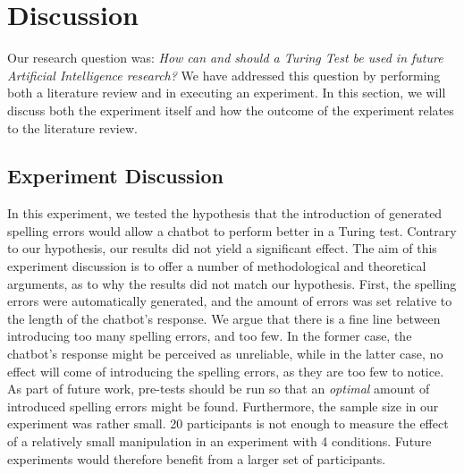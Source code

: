 \section{Discussion}
Our research question was: \textit{How can and should a Turing Test be used in future Artificial Intelligence research?} We have addressed this question by performing both a literature review and in executing an experiment. In this section, we will discuss both the experiment itself and how the outcome of the experiment relates to the literature review.

\subsection{Experiment Discussion}
In this experiment, we tested the hypothesis that the introduction of generated spelling errors would allow a chatbot to perform better in a Turing test. Contrary to our hypothesis, our results did not yield a significant effect. The aim of this experiment discussion is to offer a number of methodological and theoretical arguments, as to why the results did not match our hypothesis. First, the spelling errors were automatically generated, and the amount of errors was set relative to the length of the chatbot's response. We argue that there is a fine line between introducing too many spelling errors, and too few. In the former case, the chatbot's response might be perceived as unreliable, while in the latter case, no effect will come of introducing the spelling errors, as they are too few to notice. As part of future work, pre-tests should be run so that an \textit{optimal} amount of introduced spelling errors might be found. Furthermore, the sample size in our experiment was rather small. 20 participants is not enough to measure the effect of a relatively small manipulation in an experiment with 4 conditions. Future experiments would therefore benefit from a larger set of participants.

